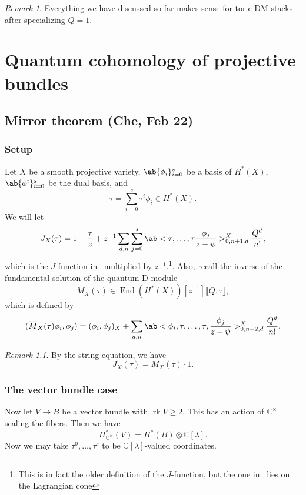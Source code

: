 \documentclass[leqno, openany]{memoir}
\theoremstyle{definition}
\theoremstyle{remark}
\newtheorem{rmk}[thm]{Remark}
\theoremstyle{plain}
\theoremstyle{definition}
\theoremstyle{remark}
\newcommand{\C}{\mathbb{C}}
\newcommand{\M}{\overline{M}}
\newcommand{\on}[1]{\operatorname{#1}}
\DeclareMathOperator{\End}{End}
\begin{document}
\begin{rmk}
    Everything we have discussed so far makes sense for toric DM stacks after specializing $Q=1$.
\end{rmk}

\chapter{Quantum cohomology of projective bundles}%
\label{cha:Quantum cohomology of projective bundles}

\section{Mirror theorem (Che, Feb 22)}%
\label{sec:Mirror theorem}

\subsection{Setup}%
\label{sub:Setup}

Let $X$ be a smooth projective variety, $\ab\{ \phi_i\}_{i=0}^s$ be a basis of $H^*(X)$, $\ab\{\phi^i\}_{i=0}^s$ be the dual basis, and 
\[ \tau = \sum_{i=0}^s \tau^i \phi_i \in H^*(X). \]
We will let
\[ J_X(\tau) = 1 + \frac{\tau}{z} + z^{-1} \sum_{d,n} \sum_{j=0}^s \ab<\tau, \ldots, \tau \frac{\phi_j}{z-\psi}>_{0,n+1,d}^X \frac{Q^d}{n!}, \]
which is the $J$-function in~ multiplied by $z^{-1}$.\footnote{This is in fact the older definition of the $J$-function, but the one in~ lies on the Lagrangian cone}. Also, recall the inverse of the fundamental solution of the quantum D-module
\[ M_X(\tau) \in \End(H^*(X))[z^{-1}]\llbracket Q,\tau \rrbracket, \]
which is defined by
\[ (\M_X(\tau) \phi_i, \phi_j) = (\phi_i, \phi_j)_X + \sum_{d,n} \ab<\phi_i,\tau, \ldots, \tau, \frac{\phi_j}{z-\psi}>_{0,n+2,d}^X \frac{Q^d}{n!}. \]

\begin{rmk}
    By the string equation, we have
    \[ J_X(\tau) = M_X(\tau) \cdot 1. \]
\end{rmk}

\subsection{The vector bundle case}%
\label{sub:The vector bundle case}


Now let $V \to B$ be a vector bundle with $\on{rk} V \geq 2$. This has an action of $\C^{\times}$ scaling the fibers. Then we have
\[ H_{\C^{\times}}^*(V) = H^*(B) \otimes \C[\lambda]. \]
Now we may take $\tau^0, \ldots, \tau^s$ to be $\C[\lambda]$-valued coordinates.
\end{document}
